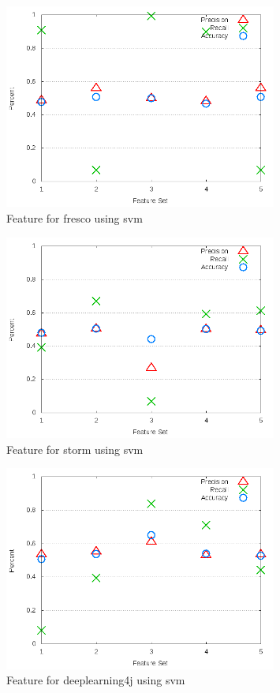 \begin{figure}[!ht]
    \centering
        \includegraphics[width=0.8\textwidth]{images/svm/test_3/fresco_sample_range}
        \caption{Feature for fresco using \gls{svm}}
        \label{fig:test_3_fresco_svm}
\end{figure}

\begin{figure}[!ht]
    \centering
        \includegraphics[width=0.8\textwidth]{images/svm/test_3/storm_sample_range}
        \caption{Feature for storm using \gls{svm}}
        \label{fig:test_3_storm_svm}
\end{figure}

\begin{figure}[!ht]
    \centering
        \includegraphics[width=0.8\textwidth]{images/svm/test_3/deeplearning4j_sample_range}
    \caption{Feature for deeplearning4j using \gls{svm}}
    \label{fig:test_3_deeplearning4j_svm}
\end{figure}

